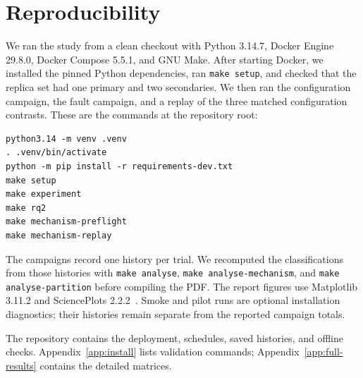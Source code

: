 \section{Reproducibility}

We ran the study from a clean checkout with Python 3.14.7, Docker Engine
29.8.0, Docker Compose 5.5.1, and GNU Make. After starting Docker, we
installed the pinned Python dependencies, ran \texttt{make setup}, and checked
that the replica set had one primary and two secondaries. We then ran the
configuration campaign, the fault campaign, and a replay of the three matched
configuration contrasts. These are the commands at the repository root:

\begin{verbatim}
python3.14 -m venv .venv
. .venv/bin/activate
python -m pip install -r requirements-dev.txt
make setup
make experiment
make rq2
make mechanism-preflight
make mechanism-replay
\end{verbatim}

The campaigns record one history per trial. We recomputed the classifications
from those histories with \texttt{make analyse},
\texttt{make analyse-mechanism}, and \texttt{make analyse-partition} before
compiling the PDF. The report figures use
Matplotlib 3.11.2 and SciencePlots 2.2.2~\cite{scienceplots}. Smoke and pilot
runs are optional installation diagnostics; their histories remain separate
from the reported campaign totals.

The repository contains the deployment, schedules, saved histories, and offline
checks. Appendix~\ref{app:install} lists validation commands;
Appendix~\ref{app:full-results} contains the detailed matrices.
